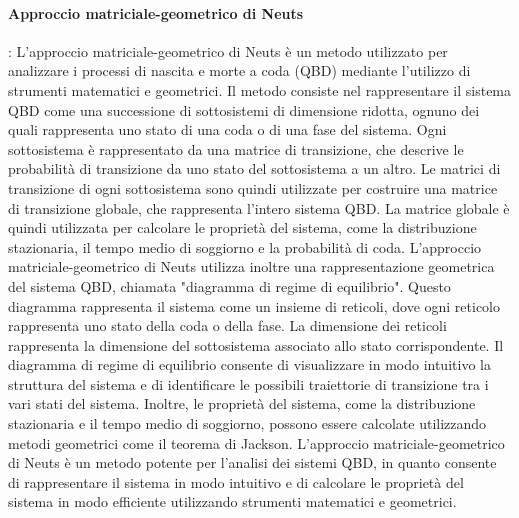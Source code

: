 \documentclass[11pt]{article}
\begin{document}
\paragraph{Approccio matriciale-geometrico di Neuts}: L'approccio matriciale-geometrico di Neuts è un metodo utilizzato per analizzare i processi di nascita e morte a coda (QBD) mediante l'utilizzo di strumenti matematici e geometrici. Il metodo consiste nel rappresentare il sistema QBD come una successione di sottosistemi di dimensione ridotta, ognuno dei quali rappresenta uno stato di una coda o di una fase del sistema. Ogni sottosistema è rappresentato da una matrice di transizione, che descrive le probabilità di transizione da uno stato del sottosistema a un altro. Le matrici di transizione di ogni sottosistema sono quindi utilizzate per costruire una matrice di transizione globale, che rappresenta l'intero sistema QBD. La matrice globale è quindi utilizzata per calcolare le proprietà del sistema, come la distribuzione stazionaria, il tempo medio di soggiorno e la probabilità di coda. L'approccio matriciale-geometrico di Neuts utilizza inoltre una rappresentazione geometrica del sistema QBD, chiamata "diagramma di regime di equilibrio". Questo diagramma rappresenta il sistema come un insieme di reticoli, dove ogni reticolo rappresenta uno stato della coda o della fase. La dimensione dei reticoli rappresenta la dimensione del sottosistema associato allo stato corrispondente. Il diagramma di regime di equilibrio consente di visualizzare in modo intuitivo la struttura del sistema e di identificare le possibili traiettorie di transizione tra i vari stati del sistema. Inoltre, le proprietà del sistema, come la distribuzione stazionaria e il tempo medio di soggiorno, possono essere calcolate utilizzando metodi geometrici come il teorema di Jackson. L'approccio matriciale-geometrico di Neuts è un metodo potente per l'analisi dei sistemi QBD, in quanto consente di rappresentare il sistema in modo intuitivo e di calcolare le proprietà del sistema in modo efficiente utilizzando strumenti matematici e geometrici. \\
\end{document}
